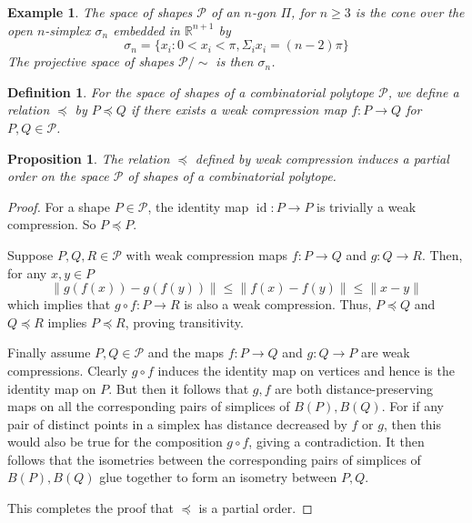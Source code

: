 \documentclass[a4paper, 12pt]{amsart}
\theoremstyle{plain}
\newtheorem{Ex}[Thm]{Example}
\newtheorem{Prop}[Thm]{Proposition}
\newtheorem{Def}[Thm]{Definition}
\begin{document}
\begin{Ex}
The space of shapes $\mathcal{P}$ of an $n$-gon $\Pi$, for $n \ge 3$ is the cone over the open $n$-simplex $\sigma_n$ embedded in $\mathbb{R}^{n+1}$ by $$\sigma_n = \{x_i: 0 < x_i < \pi, \Sigma_i x_i = (n-2)\pi\}$$ The projective space of shapes $\mathcal{P} / \sim$ is then $\sigma_n$. 

\end{Ex}


\begin{Def}
For the space of shapes of a combinatorial polytope $\mathcal{P}$, we define a relation $\preceq$ by $P \preceq Q$  if there exists a weak compression map $f: P \to Q$ for $P,Q \in \mathcal{P}$. 

\end{Def}


\begin{Prop} \label{partialorder}
The relation $\preceq$ defined by weak compression induces a partial order on the space $\mathcal{P}$ of shapes of a combinatorial polytope. 
\end{Prop}

\begin{proof} For a shape $P \in \mathcal{P}$, the identity map $\operatorname{id}: P \to P$ is trivially a weak compression. So $P \preceq P$.

 Suppose $P, Q, R \in \mathcal{P}$ with weak compression maps $f: P \to Q$ and $g: Q \to R$. Then, for any $x, y \in P$
$$ \|g(f(x)) - g(f(y))\| \leq \|f(x) - f(y)\| \leq \|x - y\| $$
which implies that $g \circ f: P \to R$ is also a weak compression. Thus, $P \preceq Q$ and $Q \preceq R$ implies $P \preceq R$, proving transitivity.

Finally assume $P, Q \in \mathcal{P}$ and the maps $f: P \to Q$ and $g: Q \to P$ are weak compressions. Clearly $g \circ f$ induces the identity map on vertices and hence is the identity map on $P$. But then it follows  that $g,f$ are both distance-preserving maps on all the corresponding pairs of simplices of $B(P), B(Q)$. For if any pair of distinct points in a simplex has distance decreased by $f$ or $g$, then this would also be true for the composition $g \circ f$, giving a contradiction. It then follows that the isometries between the corresponding pairs of simplices of $B(P), B(Q)$ glue together to form an isometry between $P,Q$. 

This completes the proof that $\preceq$ is a partial order. 
\end{proof}
\end{document}
